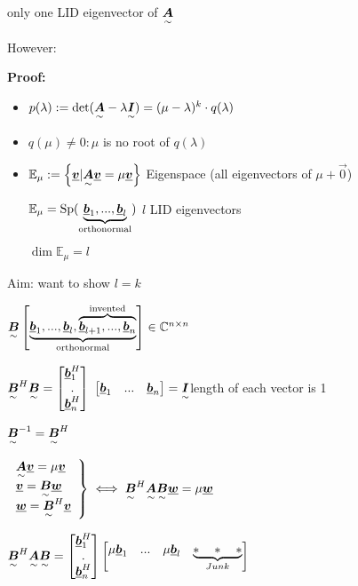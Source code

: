 only one LID eigenvector of $\ma{A}$

However:



\textbf{Proof:} 
\begin{itemize}
\item $p(\lambda):=\det(\ma{A}-\lambda\ma{I})=(\mu-\lambda)^k\cdot q(\lambda)$
\item $q(\mu)\neq 0: \mu$ is no root of $q(\lambda)$ 
\item $\mathbb{E}_\mu:=\left\lbrace\vec{v}|\ma{A}\vec{v}=\mu\vec{v}\right\rbrace$ Eigenspace (all eigenvectors of $\mu +\vec{0}$)

$\mathbb{E}_\mu=\Sp(\underbrace{\vec{b}_1,...,\vec{b}_l}_{\textrm{orthonormal}})$ \quad $l$ LID eigenvectors

$\dim\mathbb{E}_\mu =l$
\end{itemize}

Aim: want to show $l=k$

$\ma{B}\begin{bmatrix}\underbrace{\vec{b}_1,...,\vec{b}_l,\overbrace{\vec{b}_{l+1},...,\vec{b}_n}^{\textrm{invented}}}_{\textrm{orthonormal}}\end{bmatrix}  \in  \mathbb{C}^{n\times n}$

$\ma{B}^H\ma{B}= \begin{bmatrix}\vec{b}_1^H\\ . \\ \vec{b}_n^H\end{bmatrix}$
$ \begin{bmatrix}\vec{b}_1 & ... & \vec{b}_n\end{bmatrix} =\ma{I}$\quad length of each vector is 1

$\ma{B}^{-1}=\ma{B}^H$

$\left. \begin{array}{l}\ma{A}\vec{v}=\mu\vec{v}\\\vec{v}=\ma{B}\vec{w}\\\vec{w}=\ma{B}^H\vec{v}\end{array}\right\rbrace \iff \ma{B}^H\ma{A}\ma{B}\vec{w}=\mu\vec{w}$

$\ma{B}^H\ma{A}\ma{B}=
\begin{bmatrix}\vec{b}_1^H\\ . \\ \vec{b}_n^H\end{bmatrix}
\begin{bmatrix}\mu\vec{b}_1 & ... &\mu\vec{b}_l & \underbrace{*\quad*\quad*}_{Junk}\end{bmatrix}$

